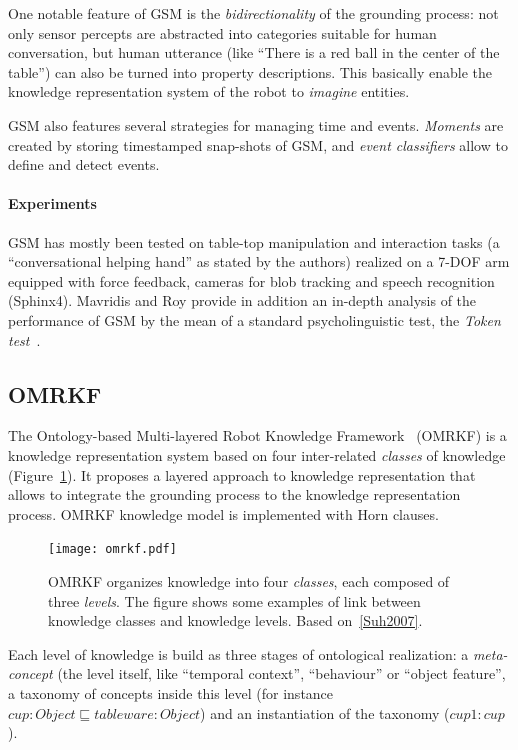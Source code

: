 \documentclass[a4paper, twocolumn]{article}
\begin{document}
One notable feature of GSM is the \emph{bidirectionality} of the grounding
process: not only sensor percepts are abstracted into categories suitable for
human conversation, but human utterance (like ``There is a red ball in the
center of the table'') can also be turned into property descriptions. This
basically enable the knowledge representation system of the robot to
\emph{imagine} entities.

GSM also features several strategies for managing time and events.
\emph{Moments} are created by storing timestamped snap-shots of GSM, and
\emph{event classifiers} allow to define and detect events.

\paragraph{Experiments} GSM has mostly been tested on table-top manipulation
and interaction tasks (a ``conversational helping hand'' as stated by the
authors) realized on a 7-DOF arm equipped with force feedback, cameras for blob
tracking and speech recognition (Sphinx4). Mavridis and Roy provide in addition
an in-depth analysis of the performance of GSM by the mean of a standard
psycholinguistic test, the \emph{Token test}~\cite{DiSimoni1978}.

\subsection{OMRKF}
\label{sect|omrkf}

The Ontology-based Multi-layered Robot Knowledge Framework~\cite{Suh2007}
(OMRKF) is a knowledge representation system based on four inter-related
\emph{classes} of knowledge (Figure~\ref{fig|omrkf}). It proposes a layered
approach to knowledge representation that allows to integrate the grounding
process to the knowledge representation process. OMRKF knowledge model is
implemented with Horn clauses.

\begin{figure}
    \centering
    \texttt{[image: omrkf.pdf]}

    \caption{OMRKF organizes knowledge into four \emph{classes}, each composed
    of three \emph{levels}. The figure shows some examples of link between
    knowledge classes and knowledge levels. Based on~\ref{Suh2007}.}

    \label{fig|omrkf}
\end{figure}

Each level of knowledge is build as three stages of ontological realization: a
\emph{meta-concept} (the level itself, like ``temporal context'', ``behaviour''
or ``object feature'', a taxonomy of concepts inside this level (for instance
$cup : Object \sqsubseteq tableware : Object$) and an instantiation of the
taxonomy ($cup1 : cup$).
\end{document}

